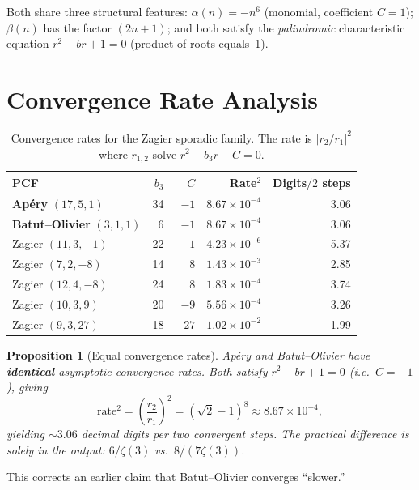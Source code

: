 \documentclass[11pt]{article}
\newcommand{\Z}{\zeta(3)}
\newtheorem{proposition}{Proposition}
\begin{document}
Both share three structural features:
$\alpha(n) = -n^6$ (monomial, coefficient $C=1$); $\beta(n)$ has the factor
$(2n+1)$; and both satisfy the \emph{palindromic} characteristic equation
$r^2 - br + 1 = 0$ (product of roots equals~1).

\section{Convergence Rate Analysis}

\begin{table}[h]
\centering
\caption{Convergence rates for the Zagier sporadic family.
The rate is $|r_2/r_1|^2$ where $r_{1,2}$ solve
$r^2 - b_3 r - C = 0$.}
\smallskip
\begin{tabular}{@{}lrrrr@{}}
\toprule
PCF & $b_3$ & $C$ & Rate${}^2$ & Digits$/2$ steps \\
\midrule
\textbf{Ap\'ery} $(17,5,1)$ & 34 & $-1$ & $8.67\times 10^{-4}$ & 3.06 \\
\textbf{Batut--Olivier} $(3,1,1)$ & 6 & $-1$ & $8.67\times 10^{-4}$ & 3.06 \\
Zagier $(11,3,-1)$ & 22 & $1$ & $4.23\times 10^{-6}$ & 5.37 \\
Zagier $(7,2,-8)$ & 14 & $8$ & $1.43\times 10^{-3}$ & 2.85 \\
Zagier $(12,4,-8)$ & 24 & $8$ & $1.83\times 10^{-4}$ & 3.74 \\
Zagier $(10,3,9)$ & 20 & $-9$ & $5.56\times 10^{-4}$ & 3.26 \\
Zagier $(9,3,27)$ & 18 & $-27$ & $1.02\times 10^{-2}$ & 1.99 \\
\bottomrule
\end{tabular}
\end{table}

\begin{proposition}[Equal convergence rates]
Ap\'ery and Batut--Olivier have \textbf{identical} asymptotic convergence rates.
Both satisfy $r^2 - br + 1 = 0$ (i.e.\ $C=-1$), giving
\[
\text{rate}^2 = \left(\frac{r_2}{r_1}\right)^{\!2}
= (\sqrt{2}-1)^8 \approx 8.67 \times 10^{-4},
\]
yielding $\sim 3.06$ decimal digits per two convergent steps.
The practical difference is solely in the output: $6/\Z$ vs.\ $8/(7\Z)$.
\end{proposition}

\noindent This corrects an earlier claim that Batut--Olivier converges
``slower.''

\end{document}
